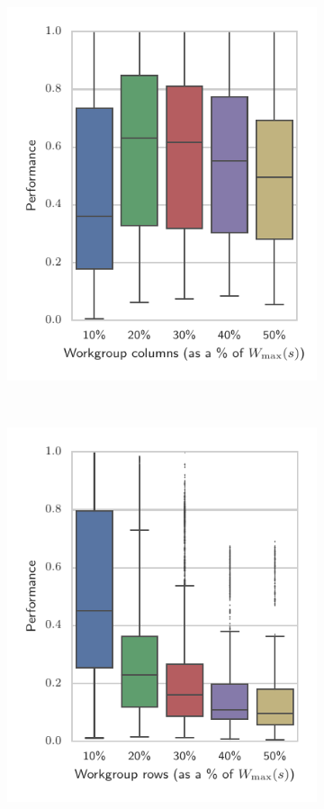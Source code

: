 \documentclass[nonatbib,preprint,nocopyrightspace,9pt]{sigplanconf}
\begin{document}
\begin{figure}
\begin{subfigure}[h]{.48\columnwidth}
      \includegraphics[width=\columnwidth]{img/performance_max_c}
      \vspace{-1.5em} %
      \caption{}
      \label{fig:performance-wg-c}
    \end{subfigure}
    ~%
    \begin{subfigure}[h]{.48\columnwidth}
      \centering
      \includegraphics[width=\columnwidth]{img/performance_max_r}

\end{subfigure}
\end{figure}
\end{document}
